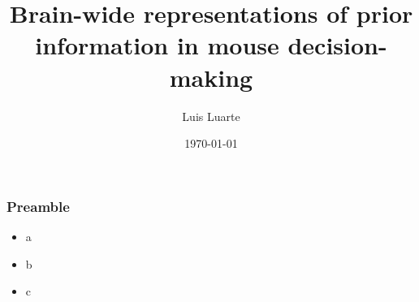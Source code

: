 \documentclass{beamer}
\title{Brain-wide representations of prior information in mouse decision-making}
\author{Luis Luarte}
\institute{UDD}
\date{\today}
\begin{document}
\begin{frame}
  \titlepage
\end{frame}

\begin{frame}
  \frametitle{Preamble}
  \begin{itemize}
    \item a
    \item b
    \item c
  \end{itemize}
\end{frame}
\end{document}
